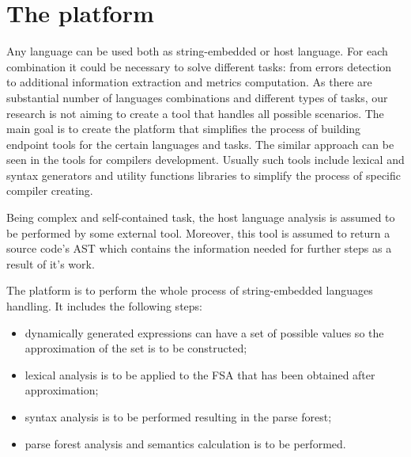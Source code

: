 \section{The platform}

Any language can be used both as string-embedded or host language. For each combination it could be necessary to solve different tasks: from errors detection to additional information extraction and metrics computation. As there are substantial number of languages combinations and different types of tasks, our research is not aiming to create a tool that handles all possible scenarios. The main goal is to create the platform that simplifies the process of building endpoint tools for the certain languages and tasks. The similar approach can be seen in the tools for compilers development. Usually such tools include lexical and syntax generators and utility functions libraries to simplify the process of  specific compiler creating.

Being complex and self-contained task, the host language analysis is assumed to be performed by some external tool. Moreover, this tool is assumed to return a source code's AST which contains the information needed for further steps as a result of it's work.

The platform is to perform the whole process of string-embedded languages handling. It includes the following steps:
\begin{itemize}
\item dynamically generated expressions can have a set of possible values so the approximation of the set is to be constructed;
\item lexical analysis is to be applied to the FSA that has been obtained after approximation;
\item syntax analysis is to be performed resulting in the parse forest;
\item parse forest analysis and semantics calculation is to be performed.
\end{itemize}





